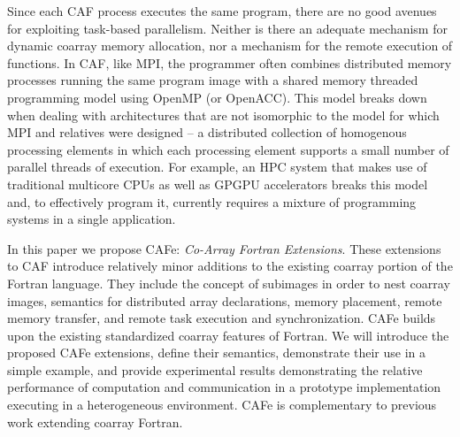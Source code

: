 Since each CAF process executes the same program, there are no good avenues for exploiting
task-based parallelism.  Neither is there an adequate mechanism for dynamic coarray memory
allocation, nor a mechanism for the remote execution of functions.  In CAF, like MPI, the
programmer often combines distributed memory processes running the same program image with a
shared memory threaded programming model using OpenMP (or OpenACC).  This model breaks down
when dealing with architectures that are not isomorphic to the model for which MPI and
relatives were designed -- a distributed collection of homogenous processing elements in
which each processing element supports a small number of parallel threads of execution.  For
example, an HPC system that makes use of traditional multicore CPUs as well as GPGPU accelerators
breaks this model and, to effectively program it, currently requires a mixture of programming
systems in a single application.

In this paper we propose CAFe: \emph{Co-Array Fortran Extensions}.  These extensions to CAF introduce
relatively minor additions to the existing coarray portion of the Fortran language.  They
include the concept of subimages in order to nest coarray images, semantics for distributed
array declarations, memory placement, remote memory transfer, and remote task execution
and synchronization.  CAFe
builds upon the existing standardized coarray features of Fortran.  We will introduce the
proposed CAFe extensions, define their semantics, demonstrate their use in a simple
example, and provide experimental results demonstrating the relative
performance of computation and communication in a prototype implementation executing
in a heterogeneous environment.
CAFe is complementary to
previous work extending coarray Fortran\cite{mellor-crummey:2009:caf2,jin:2011:caf2}.



